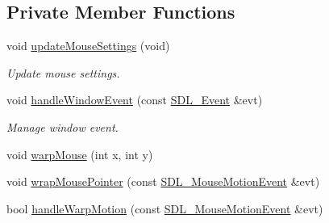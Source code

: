 \subsection*{Private Member Functions}
\begin{DoxyCompactItemize}
\item 
\mbox{\label{class_common_1_1_sdl_input_handler_a6fca1b5e89e3d0a250b220044b320d47}} 
void \hyperlink{class_common_1_1_sdl_input_handler_a6fca1b5e89e3d0a250b220044b320d47}{update\+Mouse\+Settings} (void)
\begin{DoxyCompactList}\small\item\em Update mouse settings. \end{DoxyCompactList}\item 
\mbox{\label{class_common_1_1_sdl_input_handler_aa47a9305fe7810fdff8c750123cf8e93}} 
void \hyperlink{class_common_1_1_sdl_input_handler_aa47a9305fe7810fdff8c750123cf8e93}{handle\+Window\+Event} (const \hyperlink{union_s_d_l___event}{S\+D\+L\+\_\+\+Event} \&evt)
\begin{DoxyCompactList}\small\item\em Manage window event. \end{DoxyCompactList}\item 
void \hyperlink{class_common_1_1_sdl_input_handler_a589923be034191404d6597dfc8cee282}{warp\+Mouse} (int x, int y)
\item 
void \hyperlink{class_common_1_1_sdl_input_handler_aa73cf0ac43983be445f0fcf11e91eeef}{wrap\+Mouse\+Pointer} (const \hyperlink{struct_s_d_l___mouse_motion_event}{S\+D\+L\+\_\+\+Mouse\+Motion\+Event} \&evt)
\item 
bool \hyperlink{class_common_1_1_sdl_input_handler_a6ff9bcb5862bc2c14a13bbd573d6fdf4}{handle\+Warp\+Motion} (const \hyperlink{struct_s_d_l___mouse_motion_event}{S\+D\+L\+\_\+\+Mouse\+Motion\+Event} \&evt)
\end{DoxyCompactItemize}
